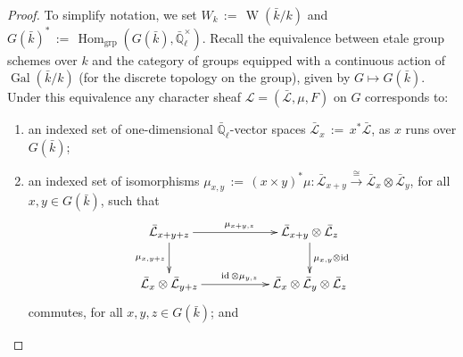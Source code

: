 \documentclass[11pt]{amsart}
\makeatletter
\theoremstyle{plain}
\theoremstyle{definition}
\theoremstyle{remark}
\newcommand{\EE}{\mathbb{\bar Q}_\ell}
\newcommand{\bFq}{\bar{k}}
\newcommand{\Fq}{k}
\newcommand{\EEx}{\EE^\times}
\DeclareMathOperator{\Gal}{Gal}
\DeclareMathOperator{\Weil}{W}
\DeclareMathOperator{\Hom}{Hom}
\DeclareMathOperator{\id}{id}
\newcommand{\ceq}{{\, :=\, }}
\newcommand{\iso}{{\ \cong\ }}
\newcommand{\cs}[1]{{\mathcal{#1}}}
\newcommand{\gcs}[1]{{\mathcal{\bar #1}}}
\newcommand{\labitem}[2]{%
\def\@itemlabel{\textbf{#1}}
\item
\def\@currentlabel{#1}\label{#2}}
\makeatother
\begin{document}
\begin{proof}
  To simplify notation, we set $W_\Fq \ceq \Weil(\bFq/\Fq)$ and
  $G(\bFq)^* \ceq \Hom_\text{grp}(G(\bFq),\EEx)$.  Recall the
  equivalence between etale group schemes over $\Fq$ and the category
  of groups equipped with a continuous action of $\Gal(\bFq/\Fq)$ (for
  the discrete topology on the group), given by $G \mapsto G(\bFq)$.
  Under this equivalence any character sheaf $\cs{L}=(\gcs{L},\mu,F)$
  on $G$ corresponds to:
  \begin{enumerate}
  \labitem{(cs.0)}{cs.0} an indexed set of one-dimensional
    $\EE$-vector spaces $\gcs{L}_x \ceq x^*\gcs{L}$, as $x$ runs over
    $G(\bFq)$;

  \labitem{(cs.1)}{cs.1} an indexed set of isomorphisms
    $\mu_{x,y} \ceq (x \times y)^*\mu : \gcs{L}_{x+y} \mathop{\longrightarrow}\limits^{\iso} \gcs{L}_{x} \otimes \gcs{L}_{y}$,
    for all $x,y \in G(\bFq)$, such that
    \[
    \xymatrix{
      \gcs{L}_{x+y+z} \ar[rr]^{\mu_{x+y,z}} \ar[d]_{\mu_{x,y+z}}
      && \gcs{L}_{x+y}\otimes \gcs{L}_{z} \ar[d]^{\mu_{x,y} \otimes \id} \\
      \gcs{L}_{x} \otimes \gcs{L}_{y+z} \ar[rr]^{\id \otimes \mu_{y,z}}
      && \gcs{L}_{x} \otimes\gcs{L}_{y} \otimes \gcs{L}_{z}\\
      }
    \]
    commutes, for all $x,y,z\in G(\bFq)$; and


\end{enumerate}
\end{proof}
\end{document}
